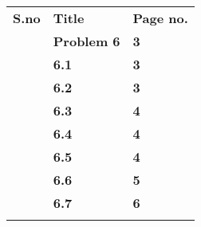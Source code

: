 \documentclass[12pt]{article}
\begin{document}
\begin{table}[H]
 			\centering
\begin{tabular}{p{0.39in}p{1.18in}p{0.39in}}
\hline
\multicolumn{1}{|p{0.39in}}{{\fontsize{14pt}{16.8pt}\selectfont \textbf{S.no}}} & 
\multicolumn{1}{|p{1.18in}}{{\fontsize{14pt}{16.8pt}\selectfont \textbf{Title}}} & 
\multicolumn{1}{|p{0.39in}|}{{\fontsize{14pt}{16.8pt}\selectfont \textbf{Page no.}}} \\
\hhline{---}
\multicolumn{1}{|p{0.39in}}{{\fontsize{14pt}{16.8pt}\selectfont \textbf{1.}}} & 
\multicolumn{1}{|p{1.18in}}{{\fontsize{14pt}{16.8pt}\selectfont \textbf{Problem 6}}} & 
\multicolumn{1}{|p{0.39in}|}{{\fontsize{14pt}{16.8pt}\selectfont \textbf{3}}} \\
\hhline{---}
\multicolumn{1}{|p{0.39in}}{} & 
\multicolumn{1}{|p{1.18in}}{{\fontsize{14pt}{16.8pt}\selectfont \textbf{6.1}}} & 
\multicolumn{1}{|p{0.39in}|}{{\fontsize{14pt}{16.8pt}\selectfont \textbf{3}}} \\
\hhline{---}
\multicolumn{1}{|p{0.39in}}{} & 
\multicolumn{1}{|p{1.18in}}{{\fontsize{14pt}{16.8pt}\selectfont \textbf{6.2}}} & 
\multicolumn{1}{|p{0.39in}|}{{\fontsize{14pt}{16.8pt}\selectfont \textbf{3}}} \\
\hhline{---}
\multicolumn{1}{|p{0.39in}}{} & 
\multicolumn{1}{|p{1.18in}}{{\fontsize{14pt}{16.8pt}\selectfont \textbf{6.3}}} & 
\multicolumn{1}{|p{0.39in}|}{{\fontsize{14pt}{16.8pt}\selectfont \textbf{4}}} \\
\hhline{---}
\multicolumn{1}{|p{0.39in}}{} & 
\multicolumn{1}{|p{1.18in}}{{\fontsize{14pt}{16.8pt}\selectfont \textbf{6.4}}} & 
\multicolumn{1}{|p{0.39in}|}{{\fontsize{14pt}{16.8pt}\selectfont \textbf{4}}} \\
\hhline{---}
\multicolumn{1}{|p{0.39in}}{} & 
\multicolumn{1}{|p{1.18in}}{{\fontsize{14pt}{16.8pt}\selectfont \textbf{6.5}}} & 
\multicolumn{1}{|p{0.39in}|}{{\fontsize{14pt}{16.8pt}\selectfont \textbf{4}}} \\
\hhline{---}
\multicolumn{1}{|p{0.39in}}{} & 
\multicolumn{1}{|p{1.18in}}{{\fontsize{14pt}{16.8pt}\selectfont \textbf{6.6}}} & 
\multicolumn{1}{|p{0.39in}|}{{\fontsize{14pt}{16.8pt}\selectfont \textbf{5}}} \\
\hhline{---}
\multicolumn{1}{|p{0.39in}}{} & 
\multicolumn{1}{|p{1.18in}}{{\fontsize{14pt}{16.8pt}\selectfont \textbf{6.7}}} & 
\multicolumn{1}{|p{0.39in}|}{{\fontsize{14pt}{16.8pt}\selectfont \textbf{6}}} \\
\hhline{---}

\end{tabular}
\end{table}
\end{document}
